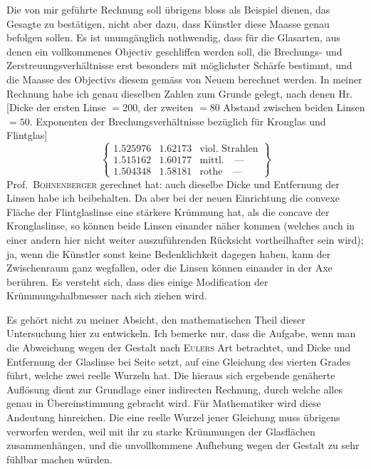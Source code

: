 Die von mir geführte Rechnung soll übrigens bloss als Beispiel dienen, das Gesagte zu bestätigen, nicht aber dazu, dass Künstler diese Maasse genau befolgen sollen. Es ist unumgänglich nothwendig, dass für die Glasarten, aus denen ein vollkommenes Objectiv geschliffen werden soll, die Brechungs- und Zerstreuungsverhältnisse erst besonders mit möglichster Schärfe bestimmt, und die Maasse des Objectivs diesem gemäss von Neuem berechnet werden. In meiner Rechnung habe ich genau dieselben Zahlen zum Grunde gelegt, nach denen Hr.
\expandafter\def\csname HistoricalNoteText513\endcsname{[Dicke der ersten Linse $=200$, der zweiten $=80$ Abstand zwischen beiden Linsen $=50$. Exponenten der Brechungsverhältnisse bezüglich für Kronglas und Flintglas]
\[
\left\{\begin{array}{lll}
1.525976&1.62173&\text{viol. Strahlen}\\
1.515162&1.60177&\text{mittl.}\quad\text{—}\\
1.504348&1.58181&\text{rothe}\quad\text{—}
\end{array}\right\}
\]
}Prof.\ \textsc{Bohnenberger} gerechnet hat: auch dieselbe Dicke und Entfernung der Linsen habe ich beibehalten. Da aber bei der neuen Einrichtung die convexe Fläche der Flintglaslinse eine stärkere Krümmung hat, als die concave der Kronglaslinse, so können beide Linsen einander näher kommen (welches auch in einer andern hier nicht weiter auszuführenden Rücksicht vortheilhafter sein wird); ja, wenn die Künstler sonst keine Bedenklichkeit dagegen haben, kann der Zwischenraum ganz wegfallen, oder die Linsen können einander in der Axe berühren. Es versteht sich, dass dies einige Modification der Krümmungshalbmesser nach sich ziehen wird.

Es gehört nicht zu meiner Absicht, den mathematischen Theil dieser Untersuchung hier zu entwickeln. Ich bemerke nur, dass die Aufgabe, wenn man die Abweichung wegen der Gestalt nach \textsc{Eulers} Art betrachtet, und Dicke und Entfernung der Glaslinse bei Seite setzt, auf eine Gleichung des vierten Grades führt, welche zwei reelle Wurzeln hat. Die hieraus sich ergebende genäherte Auflösung dient zur Grundlage einer indirecten Rechnung, durch welche alles genau in Übereinstimmung gebracht wird. Für Mathematiker wird diese Andeutung hinreichen. Die eine reelle Wurzel jener Gleichung muss übrigens verworfen werden, weil mit ihr zu starke Krümmungen der Glasflächen zusammenhängen, und die unvollkommene Aufhebung wegen der Gestalt zu sehr fühlbar machen würden.

